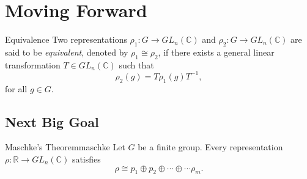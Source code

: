 
\chapter{Moving Forward}

\begin{defn}{Equivalence}{}
	Two representations \(\rho_1 \colon G \to GL_n(\mathbb{C})\) and \(\rho_2 \colon G \to GL_n(\mathbb{C})\) are said to be \emph{equivalent}, denoted by \(\rho_1 \cong \rho_2\), if there exists a general linear transformation \(T \in GL_n(\mathbb{C})\) such that \[
		\rho_2(g) = T \rho_1(g) T^{-1},
	\] 
	for all \(g \in G\).
\end{defn}

\section{Next Big Goal}

\begin{thm}{Maschke's Theorem}{maschke}
	Let \(G\) be a finite group. Every representation \(\rho \colon \mathbb{R} \to GL_n(\mathbb{C})\) satisfies \[
		\rho \cong p_1 \oplus p_2 \oplus \cdots \oplus \cdots \rho_m.
	\] 
\end{thm}
